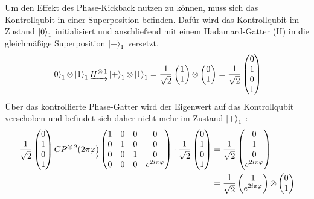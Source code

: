 Um den Effekt des Phase-Kickback nutzen zu können, 
muss sich das Kontrollqubit in einer Superposition befinden.
Dafür wird das Kontrollqubit im Zustand \(\ket{0}_1\) initialisiert und
anschließend mit einem Hadamard-Gatter (H) in die gleichmäßige Superposition \(\ket{+}_1\) versetzt.
\[\ket{0}_1 \operatorname{\otimes} \ket{1}_1 
\underrightarrow{H^{\operatorname{\otimes}1}}
 \ket{+}_1 \operatorname{\otimes} \ket{1}_1
=
\frac{1}{\sqrt{2}}
\begin{pmatrix}
  1 \\
  1
 \end{pmatrix}
 \operatorname{\otimes}
 \begin{pmatrix}
  0 \\
  1 
 \end{pmatrix}
 =
 \frac{1}{\sqrt{2}}
 \begin{pmatrix}
  0 \\
  1 \\
  0 \\
  1
\end{pmatrix}
 \]
Über das kontrollierte Phase-Gatter wird der Eigenwert auf das Kontrollqubit verschoben und
befindet sich daher nicht mehr im Zustand \(\ket{+}_1\) :
\begin{align*}
  \frac{1}{\sqrt{2}}
  \begin{pmatrix}
   0 \\
   1 \\
   0 \\
   1
  \end{pmatrix}
  \underrightarrow{CP^{\operatorname{\otimes}2}(2 \pi \varphi)}
  \begin{pmatrix}
    1 & 0 & 0 & 0\\
    0 & 1 & 0 & 0\\
    0 & 0 & 1 & 0\\
    0 & 0 & 0 & e^{2 i \pi \varphi}
  \end{pmatrix}
  \cdot
  \frac{1}{\sqrt{2}}
  \begin{pmatrix}
   0 \\
   1 \\
   0 \\
   1
  \end{pmatrix}
  &=
  \frac{1}{\sqrt{2}}
  \begin{pmatrix}
    0 \\
    1 \\
    0 \\
    e^{2 i \pi \varphi}
  \end{pmatrix} \\
  &=
  \frac{1}{\sqrt{2}}
  \begin{pmatrix}
    1 \\
    e^{2 i \pi \varphi}
   \end{pmatrix}
   \operatorname{\otimes}
   \begin{pmatrix}
    0 \\
    1 
   \end{pmatrix}
\end{align*}
